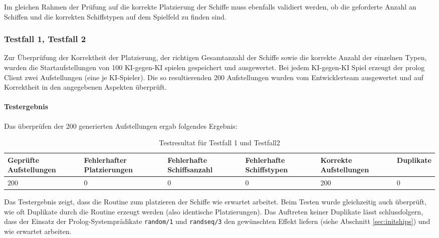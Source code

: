 	Im gleichen Rahmen der Prüfung auf die korrekte Platzierung der Schiffe muss ebenfalls validiert werden, ob die geforderte Anzahl an Schiffen und die
	korrekten Schiffstypen auf dem Spielfeld zu finden sind.

	\subsubsection{Testfall 1, Testfall 2} %
	\label{ssub:testfall_1_testfall_2}
		Zur Überprüfung der Korrektheit der Platzierung, der richtigen Gesamtanzahl der Schiffe sowie die korrekte Anzahl der einzelnen Typen, wurden 
		die Startaufstellungen von 100 KI-gegen-KI spielen gespeichert und ausgewertet. Bei jedem KI-gegen-KI Spiel erzeugt der prolog Client zwei 
		Aufstellungen (eine je KI-Spieler). Die so resultierenden 200 Aufstellungen wurden vom Entwicklerteam ausgewertet und auf Korrektheit in den 
		angegebenen Aspekten überprüft.
		
		\paragraph{Testergebnis} %
		\label{par:testergebnis}
			Das überprüfen der 200 generierten Aufstellungen ergab folgendes Ergebnis:
			\begin{table}[H] %
				\centering
				\begin{tabular}{|p{.16\textwidth}|p{}|p{}|p{}|p{}|p{}|} 
					\hline
					Geprüfte Aufstellungen & Fehlerhafter Platzierungen &Fehlerhafte Schiffsanzahl&Fehlerhafte Schiffstypen&Korrekte Aufstellungen&Duplikate\\ 
					\hline\hline
					200 & 0 & 0 & 0 & 200 & 0\\
					\hline
				\end{tabular}
				\caption{Testresultat für Testfall 1 und Testfall2}
				\label{tbl:tf1tf2}
			\end{table}
		Das Testergebnis zeigt, dass die Routine zum platzieren der Schiffe wie erwartet arbeitet. Beim Testen wurde gleichzeitig auch überprüft, 
		wie oft Duplikate durch die Routine erzeugt werden (also identische Platzierungen).
		Das Auftreten keiner Duplikate lässt schlussfolgern, dass der Einsatz der Prolog-Systemprädikate \texttt{random/1} und \texttt{randseq/3} 
		den gewünschten Effekt liefern (siehe Abschnitt \ref{sec:initships}) und wie erwartet arbeiten.
		
